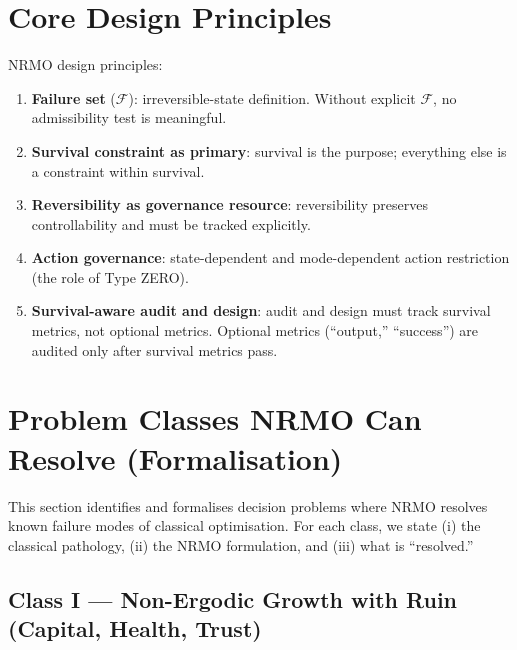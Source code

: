 \section{Core Design Principles}
\label{sec:foundations-6-core-design-principles}


\noindent
NRMO design principles:

\begin{enumerate}
\item \textbf{Failure set} ($\mathcal{F}$): irreversible-state
definition. Without explicit $\mathcal{F}$, no admissibility test is
meaningful.
\item \textbf{Survival constraint as primary}: survival is the
purpose; everything else is a constraint within survival.
\item \textbf{Reversibility as governance resource}: reversibility
preserves controllability and must be tracked explicitly.
\item \textbf{Action governance}: state-dependent and
mode-dependent action restriction (the role of Type ZERO).
\item \textbf{Survival-aware audit and design}: audit and design
must track survival metrics, not optional metrics. Optional metrics
(``output,'' ``success'') are audited only after survival metrics
pass.
\end{enumerate}

\section{Problem Classes NRMO Can Resolve (Formalisation)}
\label{sec:foundations-7-problem-classes}

This section identifies and formalises decision problems where NRMO
resolves known failure modes of classical optimisation. For each
class, we state (i) the classical pathology, (ii) the NRMO
formulation, and (iii) what is ``resolved.''

\subsection{Class I --- Non-Ergodic Growth with Ruin
(Capital, Health, Trust)}
\label{sec:foundations-7-1-class-I}

